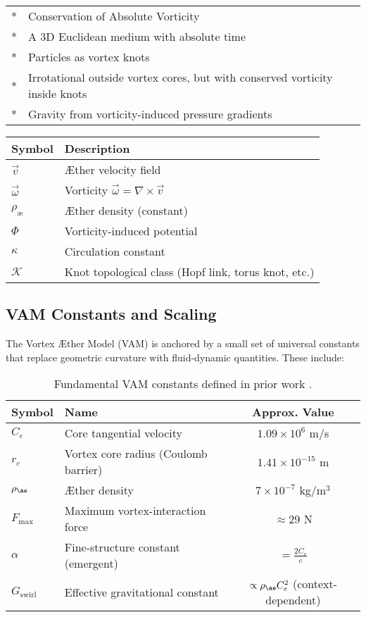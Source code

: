 \documentclass[aps,preprint,superscriptaddress]{revtex4}
\begin{document}
\begin{tabular}{ll}
    \toprule
    \midrule
        * & Conservation of Absolute Vorticity \\
        * & A 3D Euclidean medium with absolute time \\
        * & Particles as vortex knots \\
        * & Irrotational outside vortex cores, but with conserved vorticity inside knots \\
        * & Gravity from vorticity-induced pressure gradients \\
    \bottomrule
\end{tabular}


    \begin{tabular}{ll}
        \toprule
        Symbol & Description \\
        \midrule
        \(\vec{v}\) & Æther velocity field \\
        \(\vec{\omega}\) &  Vorticity \(\vec{\omega} = \nabla \times \vec{v}\) \\
        \(\rho_\text{æ}\) & Æther density (constant) \\
        \(\Phi\) & Vorticity-induced potential \\
        \(\kappa\) & Circulation constant \\
        \(\mathcal{K}\) & Knot topological class (Hopf link, torus knot, etc.) \\
        \bottomrule
    \end{tabular}

\subsection*{VAM Constants and Scaling}

The Vortex Æther Model (VAM) is anchored by a small set of universal constants that replace geometric curvature with fluid-dynamic quantities. These include:

\begin{table}[h!]
    \centering
    \begin{tabular}{llc}
        \hline
        \textbf{Symbol} & \textbf{Name} & \textbf{Approx. Value} \\
        \hline
        $C_e$ & Core tangential velocity & $1.09 \times 10^6$ m/s \\
        $r_c$ & Vortex core radius (Coulomb barrier) & $1.41 \times 10^{-15}$ m \\
        $\rho_{\ae}$ & Æther density & $7 \times 10^{-7}$ kg/m$^3$ \\
        $F_{\text{max}}$ & Maximum vortex-interaction force & $\approx 29$ N \\
        $\alpha$ & Fine-structure constant (emergent) & $= \frac{2 C_e}{c}$ \\
        $G_{\text{swirl}}$ & Effective gravitational constant & $ \propto \rho_{\ae} C_e^2$ (context-dependent) \\
        \hline
    \end{tabular}
    \caption{Fundamental VAM constants defined in prior work \cite{vam2025field, vam2025unified}.}
\end{table}
\end{document}
